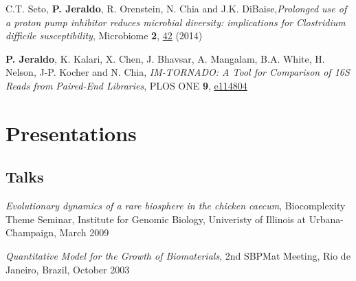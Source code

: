 \documentclass[letterpaper]{article}
\renewenvironment{itemize}{
  \begin{list}{}{
    \setlength{\leftmargin}{1.5em}
  }
}{
  \end{list}
}
\begin{document}
\begin{itemize}
\item C.T. Seto, \textbf{P. Jeraldo}, R. Orenstein, N. Chia and J.K. DiBaise,\textit{Prolonged use of a proton pump inhibitor reduces microbial diversity: implications for Clostridium difficile susceptibility}, Microbiome \textbf{2}, \href{http://dx.doi.org/10.1186/2049-2618-2-42}{42} (2014)
\item \textbf{P. Jeraldo}, K. Kalari, X. Chen, J. Bhavsar, A. Mangalam, B.A. White, H. Nelson, J-P. Kocher and N. Chia, \textit{IM-TORNADO: A Tool for Comparison of 16S Reads from Paired-End Libraries}, PLOS ONE \textbf{9}, \href{http://dx.plos.org/10.1371/journal.pone.0114804}{e114804}
\end{itemize}

\section*{Presentations}
\subsection*{Talks}
\begin{itemize}
  \item \textit{Evolutionary dynamics of a rare biosphere in the chicken
  caecum}, Biocomplexity Theme Seminar, Institute for Genomic Biology,
  Univeristy of Illinois at Urbana-Champaign, March 2009
  \item \textit{Quantitative Model for the Growth of Biomaterials},
  2nd SBPMat Meeting, Rio de Janeiro, Brazil, October 2003
\end{itemize}
\end{document}
